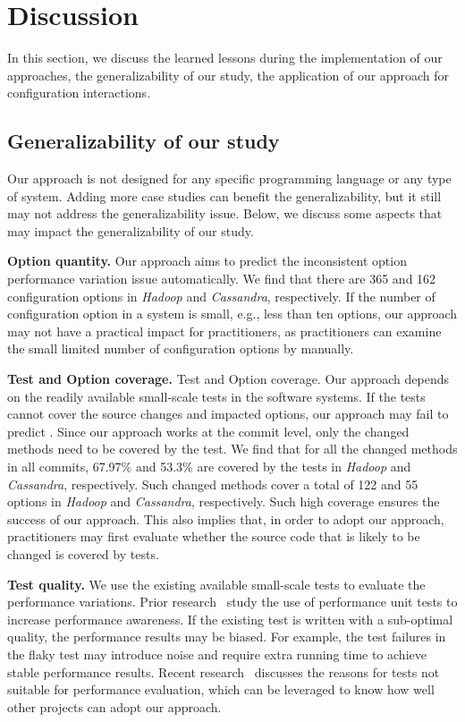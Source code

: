\section{Discussion}
\label{discussion}
In this section, we discuss the learned lessons during the implementation of our approaches, the generalizability of our study, the application of our approach for configuration interactions.

\subsection{Generalizability of our study}

Our approach is not designed for any specific programming language or any type of system. Adding more case studies can benefit the generalizability, but it still may not address the generalizability issue. Below, we discuss some aspects that may impact the generalizability of our study.

\noindent \textbf{Option quantity.} Our approach aims to predict the inconsistent option performance variation issue automatically. We find that there are 365 and 162 configuration options in \emph{Hadoop} and \emph{Cassandra}, respectively. If the number of configuration option in a system is small, e.g., less than ten options, our approach may not have a practical impact for practitioners, as practitioners can examine the small limited number of configuration options by manually.

\noindent \textbf{Test and Option coverage.} Test and Option coverage. Our approach depends on the readily available small-scale tests in the software systems. If the tests cannot cover the source changes and impacted options, our approach may fail to predict \inconsistent. Since our approach works at the commit level, only the changed methods need to be covered by the test. We find that for all the changed methods in all commits, 67.97\% and 53.3\% are covered by the tests in \emph{Hadoop} and \emph{Cassandra}, respectively. Such changed methods cover a total of 122 and 55 options in \emph{Hadoop} and \emph{Cassandra}, respectively. Such high coverage ensures the success of our approach. This also implies that, in order to adopt our approach, practitioners may first evaluate whether the source code that is likely to be changed is covered by tests.

\noindent \textbf{Test quality.} We use the existing available small-scale tests to evaluate the performance variations. Prior  research~\cite{DBLP:conf/wosp/HorkyLMST15,ding2020towards} study the use of performance unit tests to increase performance awareness. If the existing test is written with a sub-optimal quality, the performance results may be biased. For example, the test failures in the flaky test may introduce noise and require extra running time to achieve stable performance results. Recent research~\cite{ding2020towards} discusses the reasons for tests not suitable for performance evaluation, which can be leveraged to know how well other projects can adopt our approach. 



